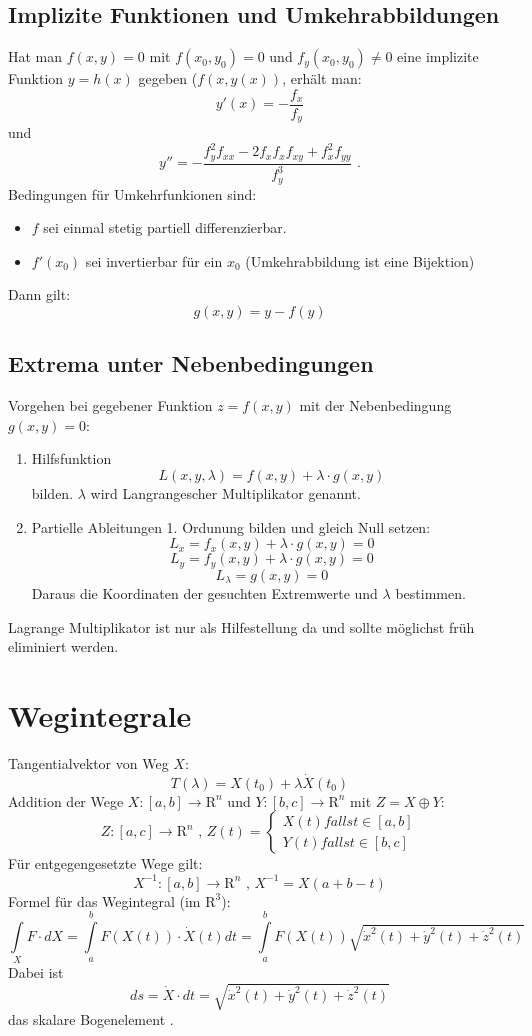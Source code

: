 \documentclass[12pt,a4paper]{article}
\begin{document}
\subsection{Implizite Funktionen und Umkehrabbildungen}
Hat man $f(x,y) = 0$ mit $f(x_0, y_0)= 0$ und $f_y(x_0,y_0) \neq 0$ eine implizite Funktion $y = h(x)$ gegeben ($f(x,y(x))$, erhält man:
\[y'(x) = -\frac{f_x}{f_y}\]
und
\[y'' = -\frac{f_y^2f_{xx} -2 f_xf_xf_{xy}+f_x^2f_{yy}}{f_y^3}\text{ .}\]
Bedingungen für Umkehrfunkionen sind:
\begin{itemize}
\item
$f$ sei einmal stetig partiell differenzierbar.
\item
$f'(x_0)$ sei invertierbar für ein $x_0$ (Umkehrabbildung ist eine Bijektion)
\end{itemize}
Dann gilt:
\[g(x,y) = y-f(y)\]

\subsection{Extrema unter Nebenbedingungen}
Vorgehen bei gegebener Funktion $z = f(x,y)$ mit der Nebenbedingung $g(x,y)=0$:
\begin{enumerate}
\item
Hilfsfunktion
\[L(x,y,\lambda) = f(x,y) + \lambda \cdot g(x,y)\]
bilden. $\lambda$ wird \glqq Langrangescher Multiplikator \grqq genannt.
\item
Partielle Ableitungen 1. Ordunung bilden und gleich Null setzen:
\[L_x = f_x(x,y) + \lambda \cdot g(x,y) = 0\]
\[L_y = f_y(x,y) + \lambda \cdot g(x,y) = 0\]
\[L_{\lambda} = g(x,y) = 0\]
Daraus die Koordinaten der gesuchten Extremwerte und $\lambda$ bestimmen.
\end{enumerate}
Lagrange Multiplikator ist nur als Hilfestellung da und sollte möglichst früh eliminiert werden.

\section{Wegintegrale}
Tangentialvektor von Weg $X$:
\[T(\lambda) = X(t_0) + \lambda \dot{X}(t_0)\]
Addition der Wege $X : [a,b] \rightarrow \mathrm{R}^n$ und $Y:[b,c]\rightarrow \mathrm{R}^n$  mit $Z = X \oplus Y$:
\[Z:[a,c] \rightarrow \mathrm{R}^n \text{ , } Z(t) = \begin{cases} X(t) falls t \in [a,b] \\
Y(t) falls t \in [b,c]\end{cases}\]
Für entgegengesetzte Wege gilt:
\[X^{-1} : [a,b] \rightarrow \mathrm{R}^n \text{ , } X^{-1} = X(a+b-t)\]
Formel für das Wegintegral (im $\mathrm{R}^3$):
\[\int\limits_X{F\cdot dX} = \int\limits_a^b{F(X(t)) \cdot \dot{X}(t) dt} = \int\limits_a^b{F(X(t)) \sqrt{\dot{x}^2(t) + \dot{y}^2(t) + \dot{z}^2(t)}}\]
Dabei ist
\[ ds = \dot{X}\cdot dt = \sqrt{\dot{x}^2(t) + \dot{y}^2(t) + \dot{z}^2(t)}\]
das \glqq skalare Bogenelement \grqq.
\end{document}
